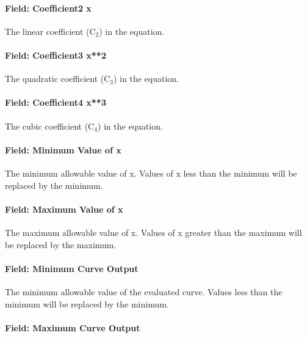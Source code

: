 \paragraph{Field: Coefficient2 x}\label{field-coefficient2-x-2}

The linear coefficient (C\(_{2}\)) in the equation.

\paragraph{Field: Coefficient3 x**2}\label{field-coefficient3-x2-1}

The quadratic coefficient (C\(_{3}\)) in the equation.

\paragraph{Field: Coefficient4 x**3}\label{field-coefficient4-x3}

The cubic coefficient (C\(_{4}\)) in the equation.

\paragraph{Field: Minimum Value of x}\label{field-minimum-value-of-x-3}

The minimum allowable value of x. Values of x less than the minimum will be replaced by the minimum.

\paragraph{Field: Maximum Value of x}\label{field-maximum-value-of-x-3}

The maximum allowable value of x. Values of x greater than the maximum will be replaced by the maximum.

\paragraph{Field: Minimum Curve Output}\label{field-minimum-curve-output-2}

The minimum allowable value of the evaluated curve. Values less than the minimum will be replaced by the minimum.

\paragraph{Field: Maximum Curve Output}\label{field-maximum-curve-output-2}

